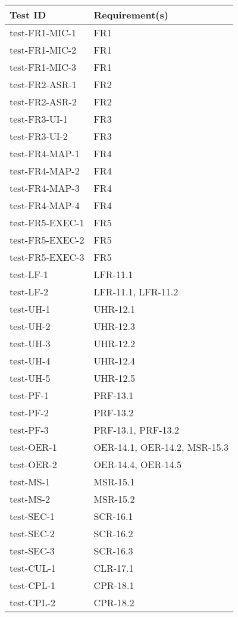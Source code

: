 \documentclass[12pt, titlepage]{article}
\begin{document}
\begin{center}
\renewcommand{\arraystretch}{1.15}
\begin{tabular}{|l|l|}
\hline
\textbf{Test ID} & \textbf{Requirement(s)} \\
\hline
test-FR1-MIC-1 & FR1 \\
test-FR1-MIC-2 & FR1 \\
test-FR1-MIC-3 & FR1 \\
test-FR2-ASR-1 & FR2 \\
test-FR2-ASR-2 & FR2 \\
test-FR3-UI-1 & FR3 \\
test-FR3-UI-2 & FR3 \\
test-FR4-MAP-1 & FR4 \\
test-FR4-MAP-2 & FR4 \\
test-FR4-MAP-3 & FR4 \\
test-FR4-MAP-4 & FR4 \\
test-FR5-EXEC-1 & FR5 \\
test-FR5-EXEC-2 & FR5 \\
test-FR5-EXEC-3 & FR5 \\
test-LF-1 & LFR-11.1 \\
test-LF-2 & LFR-11.1, LFR-11.2 \\
test-UH-1 & UHR-12.1 \\
test-UH-2 & UHR-12.3 \\
test-UH-3 & UHR-12.2 \\
test-UH-4 & UHR-12.4 \\
test-UH-5 & UHR-12.5 \\
test-PF-1 & PRF-13.1 \\
test-PF-2 & PRF-13.2 \\
test-PF-3 & PRF-13.1, PRF-13.2 \\
test-OER-1 & OER-14.1, OER-14.2, MSR-15.3 \\
test-OER-2 & OER-14.4, OER-14.5 \\
test-MS-1 & MSR-15.1 \\
test-MS-2 & MSR-15.2 \\
test-SEC-1 & SCR-16.1 \\
test-SEC-2 & SCR-16.2 \\
test-SEC-3 & SCR-16.3 \\
test-CUL-1 & CLR-17.1 \\
test-CPL-1 & CPR-18.1 \\
test-CPL-2 & CPR-18.2 \\
\hline
\end{tabular}
\end{center}
\end{document}
